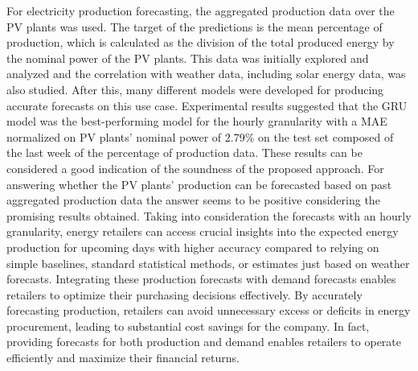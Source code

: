 For electricity production forecasting, the aggregated production data over the PV plants was used.
The target of the predictions is the mean percentage of production, which is calculated as the division of the total produced energy by the nominal power of the PV plants.
This data was initially explored and analyzed and the correlation with weather data, including solar energy data, was also studied.
After this, many different models were developed for producing accurate forecasts on this use case.
Experimental results suggested that the GRU model was the best-performing model for the hourly granularity with a MAE normalized on PV plants' nominal power of 2.79\% on the test set composed of the last week of the percentage of production data.
These results can be considered a good indication of the soundness of the proposed approach.
For answering whether the PV plants' production can be forecasted based on past aggregated production data the answer seems to be positive considering the promising results obtained.
Taking into consideration the forecasts with an hourly granularity, energy retailers can access crucial insights into the expected energy production for upcoming days with higher accuracy compared to relying on simple baselines, standard statistical methods, or estimates just based on weather forecasts.
Integrating these production forecasts with demand forecasts enables retailers to optimize their purchasing decisions effectively.
By accurately forecasting production, retailers can avoid unnecessary excess or deficits in energy procurement, leading to substantial cost savings for the company.
In fact, providing forecasts for both production and demand enables retailers to operate efficiently and maximize their financial returns.

